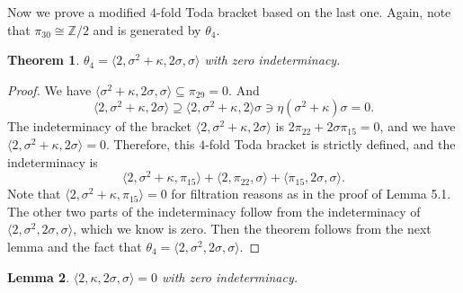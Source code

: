 \documentclass[psamsfonts]{amsart}
\newtheorem{thm}{Theorem}[section]
\newtheorem{lem}[thm]{Lemma}
\theoremstyle{definition}
\numberwithin{equation}{section}
\begin{document}
Now we prove a modified $4$-fold Toda bracket based on the last one. Again, note that $\pi_{30}\cong \mathbb{Z}/2$ and is generated by $\theta_4$.

\begin{thm}
$\theta_4 = \langle 2, \sigma^2 + \kappa, 2 \sigma, \sigma \rangle$ with zero indeterminacy.
\end{thm}

\begin{proof}
We have $\langle\sigma^2 + \kappa, 2 \sigma, \sigma\rangle \subseteq \pi_{29} =0$. And
$$\langle 2, \sigma^2 + \kappa, 2 \sigma\rangle\supseteq\langle 2, \sigma^2 + \kappa, 2\rangle\sigma\ni\eta (\sigma^2 + \kappa) \sigma =0.$$
The indeterminacy of the bracket $\langle 2, \sigma^2 + \kappa, 2 \sigma\rangle$ is $2\pi_{22}+2\sigma\pi_{15}=0$, and we have $\langle 2, \sigma^2 + \kappa, 2 \sigma\rangle=0$. Therefore, this $4$-fold Toda bracket is strictly defined, and the indeterminacy is
$$\langle 2, \sigma^2 + \kappa, \pi_{15}\rangle + \langle 2, \pi_{22}, \sigma\rangle + \langle \pi_{15}, 2 \sigma, \sigma \rangle.$$
Note that $\langle 2, \sigma^2 + \kappa, \pi_{15}\rangle = 0$ for filtration reasons as in the proof of Lemma 5.1. The other two parts of the indeterminacy follow from the indeterminacy of $\langle 2, \sigma^2, 2 \sigma, \sigma \rangle$, which we know is zero. Then the theorem follows from the next lemma and the fact that $\theta_4 = \langle 2, \sigma^2, 2 \sigma, \sigma \rangle$.
\end{proof}

\begin{lem}
$\langle 2, \kappa, 2\sigma, \sigma \rangle=0$ with zero indeterminacy.
\end{lem}
\end{document}
